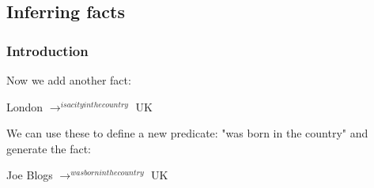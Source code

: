 
\subsection{Inferring facts}

\subsubsection{Introduction}

Now we add another fact:

London \(\rightarrow^{is a city in the country }\) UK

We can use these to define a new predicate: "was born in the country" and generate the fact:

Joe Blogs \(\rightarrow^{was born in the country }\) UK

